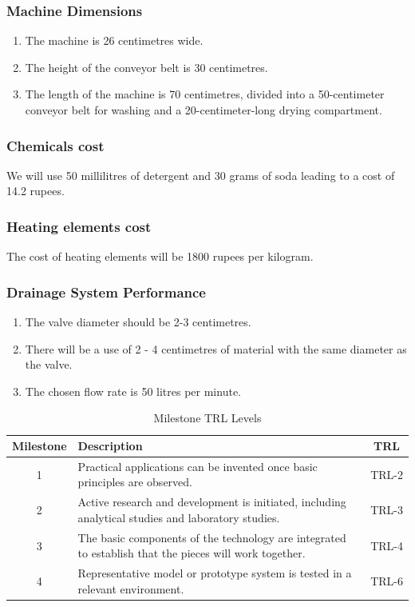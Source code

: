 \documentclass[12pt]{article} %
\begin{document}
\subsubsection{Machine Dimensions} 
    \begin{enumerate}
        \item The machine is 26 centimetres wide.
        \item The height of the conveyor belt is 30 centimetres.
        \item The length of the machine is 70 centimetres, divided into a 50-centimeter conveyor belt for washing and a 20-centimeter-long drying compartment.
    \end{enumerate}

    \subsubsection{Chemicals cost}
   We will use 50 millilitres of detergent and 30 grams of soda leading to a cost of 14.2 rupees.
   \subsubsection{Heating elements cost}
   The cost of heating elements will be 1800 rupees per kilogram.
   \subsubsection{Drainage System Performance}
    \begin{enumerate}
   \item The valve diameter should be 2-3 centimetres.
   \item There will be a  use of 2 - 4 centimetres of material with the same diameter as the valve.
   \item The chosen flow rate is 50 litres per minute.
   \end{enumerate}

\clearpage

\begin{table}[t]
\centering

\begin{tabularx}{\textwidth}{|c|X|c|} \hline
\textbf{Milestone} & \textbf{Description} & \textbf{\acrshort{TRL}} \\ \hline
1 & Practical applications can be invented once basic principles are observed. & \acrshort{TRL}-2 \\ \hline
2 & Active research and development is initiated, including analytical studies and laboratory studies. & \acrshort{TRL}-3 \\ \hline
3 & The basic components of the technology are integrated to establish that the pieces will work together. & \acrshort{TRL}-4 \\ \hline
4 & Representative model or prototype system is tested in a relevant environment. & \acrshort{TRL}-6 \\ \hline
\end{tabularx}

\caption{Milestone \acrshort{TRL} Levels}
\end{table}
\end{document}

